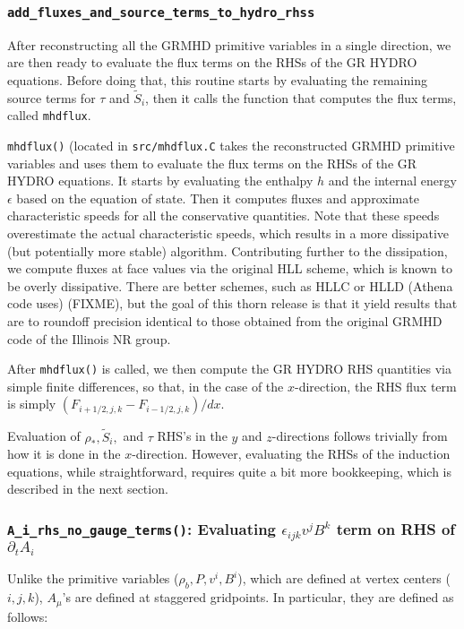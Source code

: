 \documentclass[showpacs,amsmath,amssymb,prd]{revtex4}
\begin{document}
\subsubsection{{\tt add\_fluxes\_and\_source\_terms\_to\_hydro\_rhss}}
After reconstructing all the GRMHD primitive variables in a single
direction, we are then ready to evaluate the flux terms on the RHSs of the GR HYDRO
equations. Before doing that, this routine starts by evaluating the
remaining source terms for $\tau$ and $\tilde{S}_i$, then it calls the
function that computes the flux terms, called {\tt mhdflux}.

{\tt mhdflux()} (located in {\tt src/mhdflux.C} takes the reconstructed
GRMHD primitive variables and uses them to evaluate the flux terms on
the RHSs of the GR HYDRO equations. It starts by evaluating the
enthalpy $h$ and the internal energy $\epsilon$ based on the equation
of state. Then it computes fluxes and approximate characteristic
speeds for all the conservative quantities. Note that these speeds
overestimate the actual characteristic speeds, which results in a more
dissipative (but potentially more stable) algorithm. Contributing
further to the dissipation, we compute fluxes at face values via the
original HLL scheme, which is known to be overly dissipative. There
are better schemes, such as HLLC or HLLD (Athena code uses) (FIXME),
but the goal of this thorn release is that it yield results that are
to roundoff precision identical to those obtained from the original
GRMHD code of the Illinois NR group.

After {\tt mhdflux()} is called, we then compute the GR HYDRO RHS
quantities via simple finite differences, so that, in the case of the
$x$-direction, the RHS flux term is simply $(F_{i+1/2,j,k} -
F_{i-1/2,j,k})/dx$. 

Evaluation of $\rho_*,\tilde{S}_i,$ and $\tau$ RHS's in the $y$ and
$z$-directions follows trivially from how it is done in the
$x$-direction. However, evaluating the RHSs of the induction
equations, while straightforward, requires quite a bit more
bookkeeping, which is described in the next section.

\subsubsection{{\tt A\_i\_rhs\_no\_gauge\_terms()}: Evaluating
  $\epsilon_{ijk} v^j B^k$ term on RHS of $\partial_t A_i$}
\label{A_i_rhs_no_gauge_terms}
Unlike the primitive variables ($\rho_b,P,v^i,B^i$), which are defined
at vertex centers ($i,j,k$), $A_{\mu}$'s are defined at staggered
gridpoints. In particular, they are defined as follows:
\end{document}
